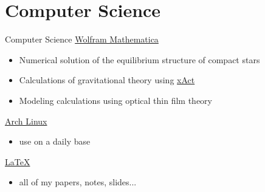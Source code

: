 \documentclass[9pt,aspectratio=169,hyperref=colorlinks]{beamer}
\begin{document}
\section{Computer Science}
\begin{frame}{Computer Science}
    \href{https://www.wolfram.com/mathematica/}{Wolfram Mathematica}
    \begin{itemize}
        \item Numerical solution of the equilibrium structure of compact stars
        \item Calculations of gravitational theory using \href{http://xact.es/index.html}{xAct}
        \item Modeling calculations using optical thin film theory
    \end{itemize}

    \href{https://archlinux.org}{Arch Linux}
    \begin{itemize}
        \item use on a daily base
    \end{itemize}

    \href{https://www.latex-project.org}{\LaTeX}
    \begin{itemize}
        \item all of my papers, notes, slides...
    \end{itemize}
\end{frame}



\end{document}
